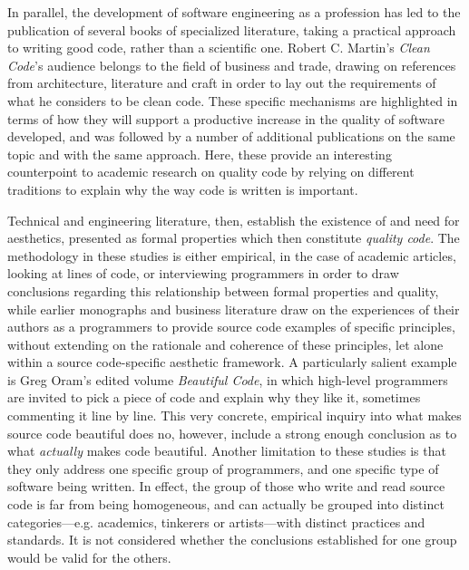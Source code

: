 In parallel, the development of software engineering as a profession has led to the publication of several books of specialized literature, taking a practical approach to writing good code, rather than a scientific one. Robert C. Martin's \emph{Clean Code}'s audience belongs to the field of business and trade, drawing on references from architecture, literature and craft in order to lay out the requirements of what he considers to be clean code. These specific mechanisms are highlighted in terms of how they will support a productive increase in the quality of software developed, and was followed by a number of additional publications on the same topic and with the same approach\cite{fowler_refactoring_1999,arns_code_2005,hunt_pragmatic_1999}. Here, these provide an interesting counterpoint to academic research on quality code by relying on different traditions to explain why the way code is written is important.

Technical and engineering literature, then, establish the existence of and need for aesthetics, presented as formal properties which then constitute \emph{quality code}. The methodology in these studies is either empirical, in the case of academic articles, looking at lines of code, or interviewing programmers in order to draw conclusions regarding this relationship between formal properties and quality, while earlier monographs and business literature draw on the experiences of their authors as a programmers to provide source code examples of specific principles, without extending on the rationale and coherence of these principles, let alone within a source code-specific aesthetic framework. A particularly salient example is Greg Oram's edited volume \emph{Beautiful Code}, in which high-level programmers are invited to pick a piece of code and explain why they like it, sometimes commenting it line by line\cite{oram_beautiful_2007}. This very concrete, empirical inquiry into what makes source code beautiful does no, however, include a strong enough conclusion as to what \emph{actually} makes code beautiful. Another limitation to these studies is that they only address one specific group of programmers, and one specific type of software being written. In effect, the group of those who write and read source code is far from being homogeneous, and can actually be grouped into distinct categories—e.g. academics, tinkerers or artists—with distinct practices and standards\cite{hayes_cultures_2017}. It is not considered whether the conclusions established for one group would be valid for the others.

